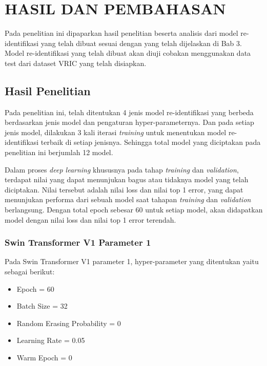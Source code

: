 \chapter{HASIL DAN PEMBAHASAN}
\label{chap:hasildanpembahasan}


Pada penelitian ini dipaparkan hasil penelitian beserta analisis dari model re-identifikasi yang telah dibuat sesuai dengan 
yang telah dijelaskan di Bab 3. Model re-identifikasi yang telah dibuat akan diuji cobakan menggunakan data test dari dataset 
VRIC yang telah disiapkan. 

\section{Hasil Penelitian}
\label{sec:hasilpenelitian}

Pada penelitian ini, telah ditentukan 4 jenis model re-identifikasi yang berbeda berdasarkan jenis model dan pengaturan 
hyper-parameternya. Dan pada setiap jenis model, dilakukan 3 kali iterasi \emph{training} untuk menentukan model re-identifikasi 
terbaik di setiap jenisnya. Sehingga total model yang diciptakan pada penelitian ini berjumlah 12 model. 

Dalam proses \emph{deep learning} khususnya pada tahap \emph{training} dan \emph{validation}, terdapat nilai yang dapat 
menunjukan bagus atau tidaknya model yang telah diciptakan. Nilai tersebut adalah nilai loss dan nilai top 1 error, yang 
dapat menunjukan performa dari sebuah model saat tahapan \emph{training} dan \emph{validation} berlangsung. Dengan total 
epoch sebesar 60 untuk setiap model, akan didapatkan model dengan nilai loss dan nilai top 1 error terendah. 

\subsection{Swin Transformer V1 Parameter 1}

Pada Swin Transformer V1 parameter 1, hyper-parameter yang ditentukan yaitu sebagai berikut:

\begin{itemize}[nolistsep]
  \item Epoch = 60
  \item Batch Size = 32
  \item Random Erasing Probability = 0
  \item Learning Rate = 0.05
  \item Warm Epoch = 0
\end{itemize}

